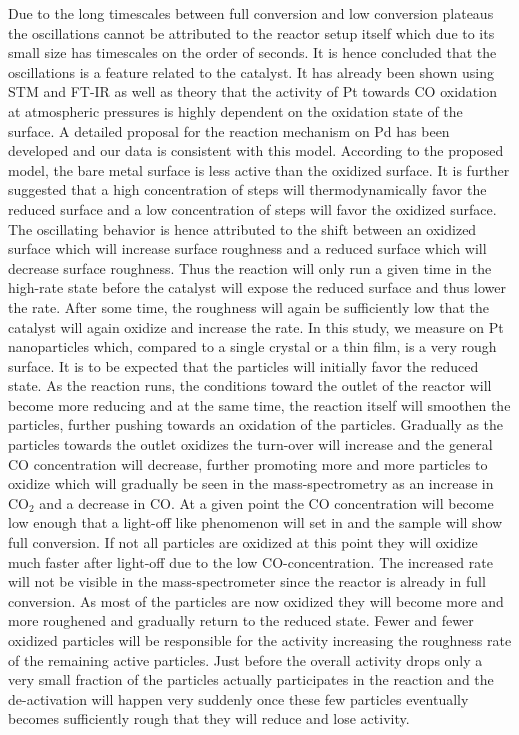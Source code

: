 \documentclass[8.5pt,twoside,twocolumn]{article}
\begin{document}
Due to the long timescales between full conversion and low conversion plateaus the oscillations cannot be attributed to the reactor setup itself which due to its small size has timescales on the order of seconds.  It is hence concluded that the oscillations is a feature related to the catalyst. It has already been shown using STM \cite{Hendriksen2002} and FT-IR \cite{Carlsson2006} as well as theory \cite{Gong2004} that the activity of Pt towards CO oxidation at atmospheric pressures is highly dependent on the oxidation state of the surface. A detailed proposal for the reaction mechanism on Pd has been developed \cite{Hendriksen2010} and our data is consistent with this model. According to the proposed model, the bare metal surface is less active than the oxidized surface. It is further suggested that a high concentration of steps will thermodynamically favor the reduced surface and a low concentration of steps will favor the oxidized surface. The oscillating behavior is hence attributed to the shift between an oxidized surface which will increase surface roughness and a reduced surface which will decrease surface roughness. Thus the reaction will only run a given time in the high-rate state before the catalyst will expose the reduced surface and thus lower the rate. After some time, the roughness will again be sufficiently low that the catalyst will again oxidize and increase the rate. In this study, we measure on Pt nanoparticles which, compared to a single crystal or a thin film, is a very rough surface. It is to be expected that the particles will initially favor the reduced state. As the reaction runs, the conditions toward the outlet of the reactor will become more reducing and at the same time, the reaction itself will smoothen the particles, further pushing towards an oxidation of the particles. Gradually as the particles towards the outlet oxidizes the turn-over will increase and the general CO concentration will decrease, further promoting more and more particles to oxidize which will gradually be seen in the mass-spectrometry as an increase in CO$_2$ and a decrease in CO. At a given point the CO concentration will become low enough that a light-off like phenomenon will set in and the sample will show full conversion. If not all particles are oxidized at this point they will oxidize much faster after light-off due to the low CO-concentration. The increased rate will not be visible in the mass-spectrometer since the reactor is already in full conversion. As most of the particles are now oxidized they will become more and more roughened and gradually return to the reduced state. Fewer and fewer oxidized particles will be responsible for the activity increasing the roughness rate of the remaining active particles. Just before the overall activity drops only a very small fraction of the particles actually participates in the reaction and the de-activation will happen very suddenly once these few particles eventually becomes sufficiently rough that they will reduce and lose activity.
\end{document}
